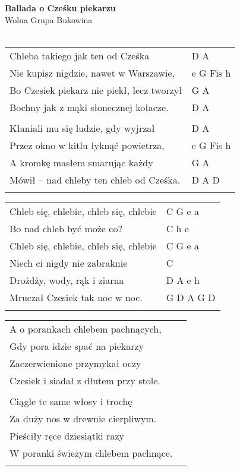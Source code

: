 \documentclass[a5paper]{article}
\begin{document}


\noindent
\fontsize{12pt}{15pt}\selectfont
\textbf{Ballada o Cześku piekarzu} \\
\fontsize{8pt}{10pt}\selectfont
Wolna Grupa Bukowina \\ \\
\fontsize{10pt}{12pt}\selectfont
{}
\begin{tabular}{@{}p{8.5cm}p{3cm}@{}}
\noindent
Chleba takiego jak ten od Cześka & D A \\
Nie kupisz nigdzie, nawet w Warszawie, & e G Fis h \\
Bo Czesiek piekarz nie piekł, lecz tworzył & G A \\
Bochny jak z mąki słonecznej kołacze. & D A \\ \\

Kłaniali mu się ludzie, gdy wyjrzał & D A \\
Przez okno w kitlu łyknąć powietrza, & e G Fis h \\
A kromkę masłem smarując każdy & G A \\
Mówił – nad chleby ten chleb od Cześka. & D A D\\ \\
\end{tabular}

\noindent
\begin{tabular}{@{}p{7.5cm}p{3cm}@{}}
Chleb się, chlebie, chleb się, chlebie & C G e a \\
Bo nad chleb być może co? & C h e \\
Chleb się, chlebie, chleb się, chlebie & C G e a \\
Niech ci nigdy nie zabraknie & C \\
Drożdży, wody, rąk i ziarna & D A e h \\
Mruczał Czesiek tak noc w noc. & G D A G D \\ \\
\end{tabular}

\noindent
\begin{tabular}{@{}p{8.5cm}p{3cm}@{}}
A o porankach chlebem pachnących, \\
Gdy pora idzie spać na piekarzy \\
Zaczerwienione przymykał oczy \\
Czesiek i siadał z dłutem przy stole. \\ \\
 
Ciągle te same włosy i trochę \\
Za duży nos w drewnie cierpliwym. \\
Pieściły ręce dziesiątki razy \\
W poranki świeżym chlebem pachnące. \\ \\
\end{tabular}
\end{document}
